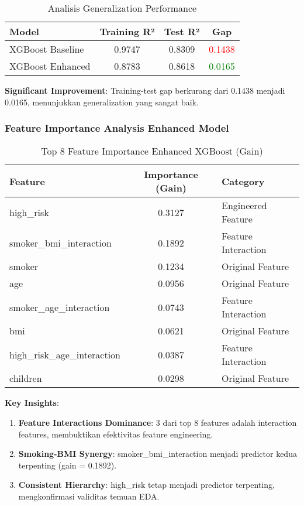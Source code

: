 \begin{table}[H]
\centering
\caption{Analisis Generalization Performance}
\label{tab:generalization-analysis}
\begin{tabular}{|l|c|c|c|}
\hline
\textbf{Model} & \textbf{Training R²} & \textbf{Test R²} & \textbf{Gap} \\
\hline
XGBoost Baseline & 0.9747 & 0.8309 & \textcolor{red}{0.1438} \\
XGBoost Enhanced & 0.8783 & 0.8618 & \textcolor{green}{0.0165} \\
\hline
\end{tabular}
\end{table}

\textbf{Significant Improvement}: Training-test gap berkurang dari 0.1438 menjadi 0.0165, menunjukkan generalization yang sangat baik.

\subsubsection{Feature Importance Analysis Enhanced Model}
\begin{table}[H]
\centering
\caption{Top 8 Feature Importance Enhanced XGBoost (Gain)}
\label{tab:enhanced-feature-importance}
\begin{tabular}{|l|c|l|}
\hline
\textbf{Feature} & \textbf{Importance (Gain)} & \textbf{Category} \\
\hline
high\_risk & 0.3127 & Engineered Feature \\
smoker\_bmi\_interaction & 0.1892 & Feature Interaction \\
smoker & 0.1234 & Original Feature \\
age & 0.0956 & Original Feature \\
smoker\_age\_interaction & 0.0743 & Feature Interaction \\
bmi & 0.0621 & Original Feature \\
high\_risk\_age\_interaction & 0.0387 & Feature Interaction \\
children & 0.0298 & Original Feature \\
\hline
\end{tabular}
\end{table}

\textbf{Key Insights}:
\begin{enumerate}
    \item \textbf{Feature Interactions Dominance}: 3 dari top 8 features adalah interaction features, membuktikan efektivitas feature engineering.
    \item \textbf{Smoking-BMI Synergy}: smoker\_bmi\_interaction menjadi predictor kedua terpenting (gain = 0.1892).
    \item \textbf{Consistent Hierarchy}: high\_risk tetap menjadi predictor terpenting, mengkonfirmasi validitas temuan EDA.
\end{enumerate}


